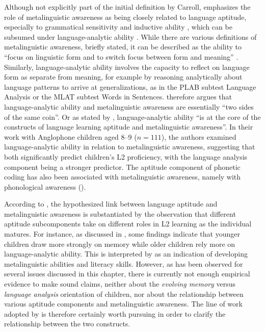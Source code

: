 \documentclass[output=paper]{langscibook}
\begin{document}
Although not explicitly part of the initial definition by Carroll, \citet{Singleton2014} emphasizes the role of metalinguistic awareness as being closely related to language aptitude, especially to grammatical sensitivity and inductive ability \citep{AldersonEtAl1997}, which can be subsumed under language-ana\-ly\-tic ability \citep{Skehan1998}. While there are various definitions of metalinguistic awareness, briefly stated, it can be described as the ability to “focus on linguistic form and to switch focus between form and meaning” \citep[277]{Jessner2008}. Similarly, language-ana\-ly\-tic ability involves the capacity to reflect on language form as separate from meaning, for example by reasoning analytically about language patterns to arrive at generalizations, as in the PLAB subtest Language Analysis or the MLAT subtest Words in Sentences. \citet[163]{Ranta2002} therefore argues that language-analytic ability and metalinguistic awareness are essentially “two sides of the same coin”. Or as stated by \citet[1111]{RoehrBrackinTellier2019}, language-analytic ability “is at the core of the constructs of language learning aptitude and metalinguistic awareness”. In their work with Anglophone children aged 8--9 ($n=111$), the authors examined language-analytic ability in relation to metalinguistic awareness, suggesting that both significantly predict children’s L2 proficiency, with the language analysis component being a stronger predictor. The aptitude component of phonetic coding has also been associated with metalinguistic awareness, namely with phonological awareness (\citealt{RoehrBrackinTellier2019}).

According to \citet{RoehrBrackinTellier2019}, the hypothesized link between language aptitude and metalinguistic awareness is substantiated by the observation that different aptitude subcomponents take on different roles in L2 learning as the individual matures. For instance, as discussed in , some findings indicate that younger children draw more strongly on memory while older children rely more on language-analytic ability. This is interpreted by \citet{RoehrBrackinTellier2019} as an indication of developing metalinguistic abilities and literacy skills. However, as has been observed for several issues discussed in this chapter, there is currently not enough empirical evidence to make sound claims, neither about the \textit{evolving memory} versus \textit{language analysis} orientation of children, nor about the relationship between various aptitude components and metalinguistic awareness. The line of work adopted by \citet{RoehrBrackinTellier2019} is therefore certainly worth pursuing in order to clarify the relationship between the two constructs.
\end{document}
